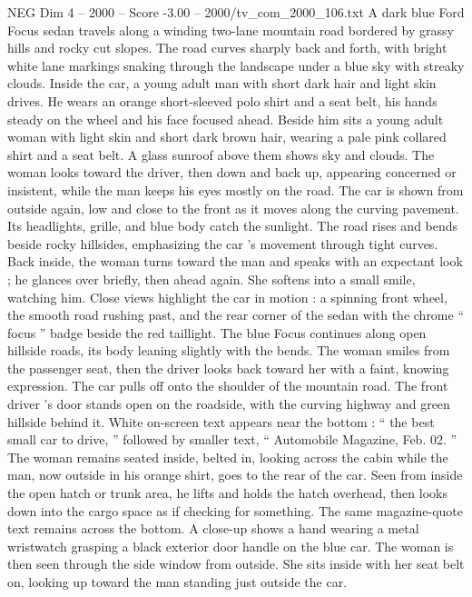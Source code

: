 \begin{textsample}{NEG Dim 4 – 2000 – Score -3.00 – 2000/tv\_com\_2000\_106.txt}  \label{ex:f4_neg_041}
A dark blue Ford Focus sedan travels along a winding two-lane mountain road bordered by grassy hills and rocky cut slopes.
The road curves sharply back and forth, with bright white lane markings snaking through the landscape under a blue sky with streaky clouds.
Inside the car, a young adult man with short dark hair and light skin drives.
He wears an orange short-sleeved polo shirt and a seat belt, his hands steady on the wheel and his face focused ahead.
Beside him sits a young adult woman with light skin and short dark brown hair, wearing a pale pink collared shirt and a seat belt.
A glass sunroof above them shows sky and clouds.
The woman looks toward the driver, then down and back up, appearing concerned or insistent, while the man keeps his eyes mostly on the road.
The car is shown from outside again, low and close to the front as it moves along the curving pavement.
Its headlights, grille, and blue body catch the sunlight.
The road rises and bends beside rocky hillsides, emphasizing the car ’s movement through tight curves.
Back inside, the woman turns toward the man and speaks with an expectant look ; he glances over briefly, then ahead again.
She softens into a small smile, watching him.
Close views highlight the car in motion : a spinning front wheel, the smooth road rushing past, and the rear corner of the sedan with the chrome “ focus ” badge beside the red taillight.
The blue Focus continues along open hillside roads, its body leaning slightly with the bends.
The woman smiles from the passenger seat, then the driver looks back toward her with a faint, knowing expression.
The car pulls off onto the shoulder of the mountain road.
The front driver ’s door stands open on the roadside, with the curving highway and green hillside behind it.
White on-screen text appears near the bottom : “ the best small car to drive, ” followed by smaller text, “ Automobile Magazine, Feb. 02. ” The woman remains seated inside, belted in, looking across the cabin while the man, now outside in his orange shirt, goes to the rear of the car.
Seen from inside the open hatch or trunk area, he lifts and holds the hatch overhead, then looks down into the cargo space as if checking for something.
The same magazine-quote text remains across the bottom.
A close-up shows a hand wearing a metal wristwatch grasping a black exterior door handle on the blue car.
The woman is then seen through the side window from outside.
She sits inside with her seat belt on, looking up toward the man standing just outside the car.

\end{textsample}
